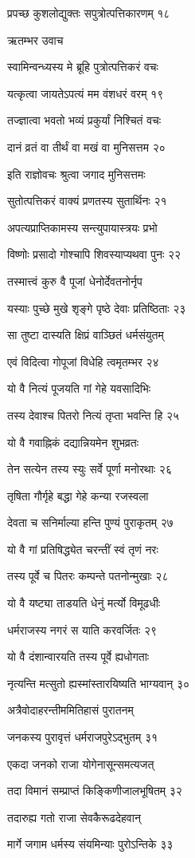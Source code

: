 प्रपच्छ कुशलोद्युक्तः सपुत्रोत्पत्तिकारणम् १८

ऋतम्भर उवाच

स्वामिन्वन्ध्यस्य मे ब्रूहि पुत्रोत्पत्तिकरं वचः

यत्कृत्वा जायतेऽपत्यं मम वंशधरं वरम् १९

तज्ज्ञात्वा भवतो भव्यं प्रकुर्यां निश्चितं वचः

दानं व्रतं वा तीर्थं वा मखं वा मुनिसत्तम २०

इति राज्ञोवचः श्रुत्वा जगाद मुनिसत्तमः

सुतोत्पत्तिकरं वाक्यं प्रणतस्य सुतार्थिनः २१

अपत्यप्राप्तिकामस्य सन्त्युपायास्त्रयः प्रभो

विष्णोः प्रसादो गोश्चापि शिवस्याप्यथवा पुनः २२

तस्मात्त्वं कुरु वै पूजां धेनोर्देवतनोर्नृप

यस्याः पुच्छे मुखे शृङ्गे पृष्ठे देवाः प्रतिष्ठिताः २३

सा तुष्टा दास्यति क्षिप्रं वाञ्छितं धर्मसंयुतम्

एवं विदित्वा गोपूजां विधेहि त्वमृतम्भर २४

यो वै नित्यं पूजयति गां गेहे यवसादिभिः

तस्य देवाश्च पितरो नित्यं तृप्ता भवन्ति हि २५

यो वै गवाह्निकं दद्यान्नियमेन शुभव्रतः

तेन सत्येन तस्य स्युः सर्वे पूर्णा मनोरथाः २६

तृषिता गौर्गृहे बद्धा गेहे कन्या रजस्वला

देवता च सनिर्माल्या हन्ति पुण्यं पुराकृतम् २७

यो वै गां प्रतिषिद्ध्येत चरन्तीं स्वं तृणं नरः

तस्य पूर्वे च पितरः कम्पन्ते पतनोन्मुखाः २८

यो वै यष्ट्या ताडयति धेनुं मर्त्यो विमूढधीः

धर्मराजस्य नगरं स याति करवर्जितः २९

यो वै दंशान्वारयति तस्य पूर्वे ह्यधोगताः

नृत्यन्ति मत्सुतो ह्यस्मांस्तारयिष्यति भाग्यवान् ३०

अत्रैवोदाहरन्तीममितिहासं पुरातनम्

जनकस्य पुरावृत्तं धर्मराजपुरेऽद्भुतम् ३१

एकदा जनको राजा योगेनासून्समत्यजत्

तदा विमानं सम्प्राप्तं किङ्किणीजालभूषितम् ३२

तदारुह्य गतो राजा सेवकैरूढदेहवान्

मार्गे जगाम धर्मस्य संयमिन्याः पुरोऽन्तिके ३३

